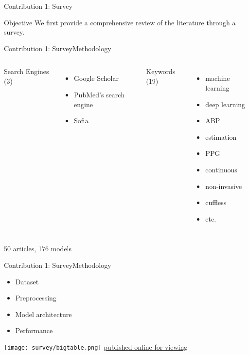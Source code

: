 \begin{frame}{Contribution 1: Survey}
    \begin{block}{Objective}
        We first provide a comprehensive review of the literature through a survey.
    \end{block}
\end{frame}

\begin{frame}{Contribution 1: Survey}{Methodology}
    \begin{columns}
        Search Engines (3)
        \begin{itemize}
            \item Google Scholar
            \item PubMed's search engine
            \item Sofia
        \end{itemize}

        Keywords (19)
        \begin{itemize}
            \item machine learning
            \item deep learning
            \item ABP
            \item estimation
            \item PPG
            \item continuous
            \item non-invasive
            \item cuffless
            \item etc.
        \end{itemize}
    \end{columns}

    \pause
    \vspace{1cm}
    \centering
    \alert{50 articles, 176 models}
\end{frame}

\begin{frame}{Contribution 1: Survey}{Methodology}
    \begin{itemize}
        \item Dataset
        \item Preprocessing
        \item Model architecture
        \item Performance
    \end{itemize}
    \texttt{[image: survey/bigtable.png]}
    \href{https://docs.google.com/spreadsheets/u/1/d/e/2PACX-1vR-3MoAcaD-N30ZM15ozSlxh8RHTUBv2KETb9f2g852htlH-5PNt_S8khVnUFLWeEo2H91ZW9hCEi8o/pubhtml}{published online for viewing}
\end{frame}

